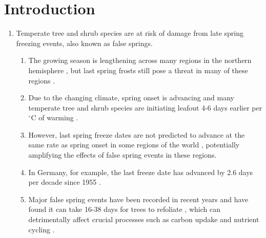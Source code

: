 \documentclass{article}\usepackage[]{graphicx}\usepackage[]{color}
\begin{document}
\section*{Introduction}
\begin{enumerate}
\item Temperate tree and shrub species are at risk of damage from late spring freezing events, also known as false springs.
\begin{enumerate}
\item The growing season is lengthening across many regions in the northern hemisphere \citep{Chen2005, Liu2006, Kukal2018}, but last spring frosts still pose a threat in many of these regions \citep{Wypych2016a}.
\item Due to the changing climate, spring onset is advancing and many temperate tree and shrub species are initiating leafout 4-6 days earlier per $^{\circ}$C of warming \citep{Wolkovich2012, IPCC2014}.
\item However, last spring freeze dates are not predicted to advance at the same rate as spring onset in some regions of the world \citep{Inouye2008, Martin2010, Labe2016, Sgubin2018}, potentially amplifying the effects of false spring events in these regions.
\item In Germany, for example, the last freeze date has advanced by 2.6 days per decade since 1955 \citep{Zohner2016}.
\item Major false spring events have been recorded in recent years and have found it can take 16-38 days for trees to refoliate \citep{Gu2008, Augspurger2009, Augspurger2013, Menzel2015}, which can detrimentally affect crucial processes such as carbon updake and nutrient cycling \citep{Hufkens2012, Richardson2013, Klosterman2018}.
\end{enumerate}



\end{enumerate}
\end{document}
